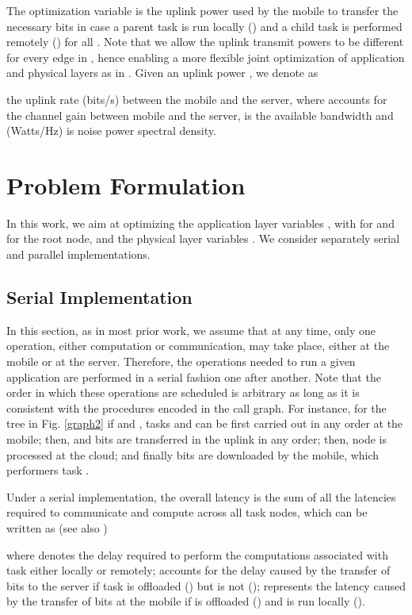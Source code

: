 \documentclass[journal,twocolumn,10pt,twoside]{IEEEtranTCOM}
\theoremstyle{plain}
\theoremstyle{plain}
\theoremstyle{remark}
\begin{document}
The optimization variable  is the uplink power used by the mobile to transfer the necessary  bits in case a parent task  is run locally  () and a child task  is performed remotely () for all . Note that we allow the uplink transmit powers  to be different for every edge in , hence enabling a more flexible joint optimization of application and physical layers as in \cite{bar}. Given an uplink power , we denote as

the uplink rate (bits/s) between the mobile and the server, where  accounts for the channel gain between mobile and the server,  is the available bandwidth and  (Watts/Hz) is noise power spectral density.





\section{Problem Formulation}
\label{sec:prob}
In this work, we aim at optimizing the application layer variables , with  for  and for the root node, and the physical layer variables . We consider separately serial and parallel implementations.
\subsection{Serial Implementation}
\label{sec:ser}
In this section, as in most prior work, we assume that at any time, only one operation, either computation or communication, may take place, either at the mobile or at the server. Therefore, the operations needed to run a given application are performed in a serial fashion one after another. Note that the order in which these operations are scheduled is arbitrary as long as it is consistent with the procedures encoded in the call graph. For instance, for the tree  in Fig. \ref{graph2} if  and , tasks  and  can be first carried out in any order at the mobile; then,  and  bits are transferred in the uplink in any order; then, node  is processed at the cloud; and finally  bits are downloaded by the mobile, which performers task .

Under a serial implementation, the overall latency is the sum of all the latencies required to communicate and compute across all task nodes, which can be written as (see also \cite{bar})

where  denotes the delay required to perform the computations associated with task  either locally or remotely;  accounts for the delay caused by the transfer of  bits to the server if task  is offloaded () but  is not ();  represents the latency caused by the transfer of  bits at the mobile if  is offloaded () and  is run locally ().
\end{document}
